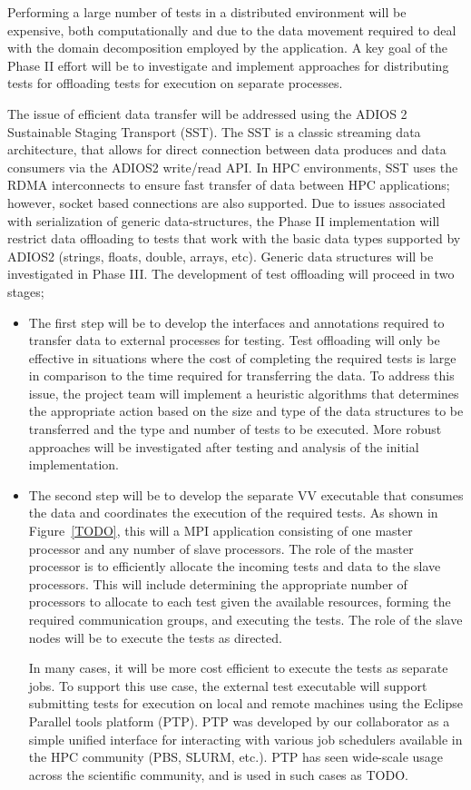 Performing a large number of \VV tests in a distributed environment will be expensive, both computationally and due to the data movement required to deal with the domain decomposition employed by the application. A key goal of the Phase II effort will be to investigate and implement approaches for distributing tests for offloading tests for execution on separate processes. 

The issue of efficient data transfer will be addressed using the ADIOS 2 Sustainable Staging Transport (SST). The SST is a classic streaming data architecture, that allows for direct connection between data produces and data consumers via the ADIOS2 write/read API. In HPC environments, SST uses the RDMA interconnects to ensure fast transfer of data between HPC applications; however, socket based connections are also supported. Due to issues associated with serialization of generic data-structures, the Phase II implementation will restrict data offloading to tests that work with the basic data types supported by ADIOS2 (strings, floats, double, arrays, etc). Generic data structures will be investigated in Phase III. The development of test offloading will proceed in two stages; 

\begin{itemize}
 \item The first step will be to develop the interfaces and annotations required to transfer data to external processes for testing. Test offloading will only be effective in situations where the cost of completing the required tests is large in comparison to the time required for transferring the data. To address this issue, the project team will implement a heuristic algorithms that determines the appropriate action based on the size and type of the data structures to be transferred and the type and number of tests to be executed. More robust approaches will be investigated after testing and analysis of the initial implementation.  
 \item The second step will be to develop the separate VV executable that consumes the data and coordinates the execution of the required tests. As shown in Figure~\ref{TODO}, this will a MPI application consisting of one master processor and any number of slave processors. The role of the master processor is to efficiently allocate the incoming tests and data to the slave processors. This will include determining the appropriate number of processors to allocate to each test given the available resources, forming the required communication groups, and executing the tests. The role of the slave nodes will be to execute the tests as directed. 
 
 In many cases, it will be more cost efficient to execute the tests as separate jobs. To support this use case, the external test executable will support submitting tests for execution on local and remote machines using the Eclipse Parallel tools platform (PTP). PTP was developed by our collaborator as a simple unified interface for interacting with various job schedulers available in the HPC community (PBS, SLURM, etc.). PTP has seen wide-scale usage across the scientific community, and is used in such cases as TODO.
 \end{itemize}



